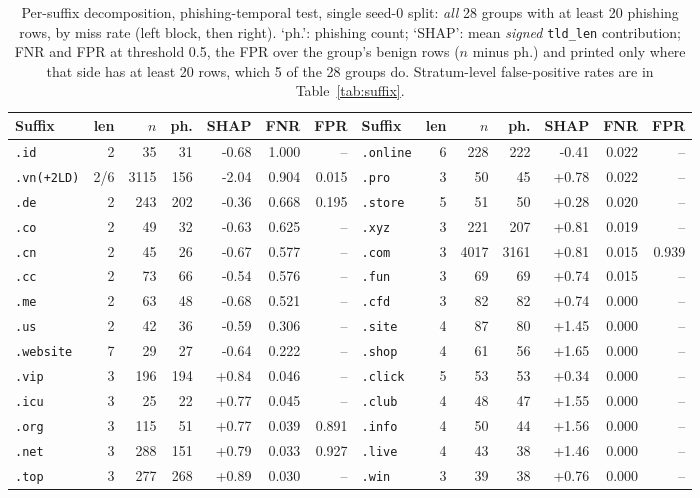 \begin{table}[t]\centering
\caption{Per-suffix decomposition, phishing-temporal test, single seed-0 split: \emph{all} 28 groups with at least 20 phishing rows, by miss rate (left block, then right). `ph.': phishing count; `SHAP': mean \emph{signed} \texttt{tld\_len} contribution; FNR and FPR at threshold 0.5, the FPR over the group's benign rows ($n$ minus ph.) and printed only where that side has at least 20 rows, which 5 of the 28 groups do. Stratum-level false-positive rates are in Table~\ref{tab:suffix}.}
\label{tab:tld}
\footnotesize\setlength{\tabcolsep}{3pt}
\begin{tabular}{lrrrrrr@{\hspace{10pt}}lrrrrrr}\toprule
Suffix & len & $n$ & ph. & SHAP & FNR & FPR & Suffix & len & $n$ & ph. & SHAP & FNR & FPR \\ \midrule
\texttt{.id} & 2 & 35 & 31 & -0.68 & 1.000 & -- & \texttt{.online} & 6 & 228 & 222 & -0.41 & 0.022 & -- \\
\texttt{.vn(+2LD)} & 2/6 & 3115 & 156 & -2.04 & 0.904 & 0.015 & \texttt{.pro} & 3 & 50 & 45 & +0.78 & 0.022 & -- \\
\texttt{.de} & 2 & 243 & 202 & -0.36 & 0.668 & 0.195 & \texttt{.store} & 5 & 51 & 50 & +0.28 & 0.020 & -- \\
\texttt{.co} & 2 & 49 & 32 & -0.63 & 0.625 & -- & \texttt{.xyz} & 3 & 221 & 207 & +0.81 & 0.019 & -- \\
\texttt{.cn} & 2 & 45 & 26 & -0.67 & 0.577 & -- & \texttt{.com} & 3 & 4017 & 3161 & +0.81 & 0.015 & 0.939 \\
\texttt{.cc} & 2 & 73 & 66 & -0.54 & 0.576 & -- & \texttt{.fun} & 3 & 69 & 69 & +0.74 & 0.015 & -- \\
\texttt{.me} & 2 & 63 & 48 & -0.68 & 0.521 & -- & \texttt{.cfd} & 3 & 82 & 82 & +0.74 & 0.000 & -- \\
\texttt{.us} & 2 & 42 & 36 & -0.59 & 0.306 & -- & \texttt{.site} & 4 & 87 & 80 & +1.45 & 0.000 & -- \\
\texttt{.website} & 7 & 29 & 27 & -0.64 & 0.222 & -- & \texttt{.shop} & 4 & 61 & 56 & +1.65 & 0.000 & -- \\
\texttt{.vip} & 3 & 196 & 194 & +0.84 & 0.046 & -- & \texttt{.click} & 5 & 53 & 53 & +0.34 & 0.000 & -- \\
\texttt{.icu} & 3 & 25 & 22 & +0.77 & 0.045 & -- & \texttt{.club} & 4 & 48 & 47 & +1.55 & 0.000 & -- \\
\texttt{.org} & 3 & 115 & 51 & +0.77 & 0.039 & 0.891 & \texttt{.info} & 4 & 50 & 44 & +1.56 & 0.000 & -- \\
\texttt{.net} & 3 & 288 & 151 & +0.79 & 0.033 & 0.927 & \texttt{.live} & 4 & 43 & 38 & +1.46 & 0.000 & -- \\
\texttt{.top} & 3 & 277 & 268 & +0.89 & 0.030 & -- & \texttt{.win} & 3 & 39 & 38 & +0.76 & 0.000 & -- \\
\bottomrule\end{tabular}\end{table}
